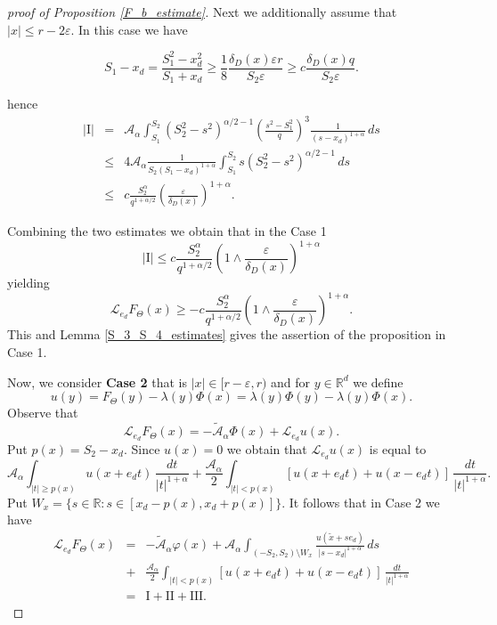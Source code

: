 \documentclass[a4paper,12pt,reqno]{amsart}
\theoremstyle{definition}
\theoremstyle{remark}
\newcommand{\eps}{\varepsilon}
\newcommand{\calA}{\mathcal{A}}
\newcommand{\Aa}{\mathcal{A}_{\alpha}}
\newcommand{\calL}{\mathcal{L}}
\newcommand{\R}{\mathds{R}}
\begin{document}
\begin{proof}[proof of Proposition \ref{F_b_estimate}]
Next we additionally assume that  $|x|\le r-2\eps$. In this case we have

$$S_1-x_d=  \frac {S^2_1-x^2_d}{S_1+x_d}\ge \frac18 \frac{\delta_D(x)\eps r}{S_2\eps}\ge c \frac{\delta_D(x) q}{S_2 \eps}. $$

hence
\begin{eqnarray*}
|\text{I}|
&=& \calA_{\alpha} \int_{S_{1}}^{S_{2}} 
(S_2^2-s^2)^{\alpha/2-1}\left(\frac{s^2-S_1^2}q\right)^3\frac1{(s - x_d)^{1+\alpha} }
 \, ds\\
&\le& 4\calA_{\alpha}\frac1{S_2(S_1-x_d)^{1+\alpha}} \int_{S_{1}}^{S_{2}} 
s(S_2^2-s^2)^{\alpha/2-1}
 \, ds\\  
&\le& c\frac{S_{2}^\alpha}{q^{1+\alpha/2}}\left(\frac \eps{\delta_D(x)}\right)^{1+\alpha}.
\end{eqnarray*}

Combining the two estimates we obtain that in the Case 1
$$|\text{I}|\le  c\frac{S_{2}^\alpha}{q^{1+\alpha/2}}\left(1\wedge\frac \eps{\delta_D(x)}\right)^{1+\alpha}$$
yielding
$$\calL_{e_d} F_{\Theta}(x)\ge -c\frac{S_{2}^\alpha}{q^{1+\alpha/2}}\left(1\wedge\frac \eps{\delta_D(x)}\right)^{1+\alpha}.$$
This and Lemma \ref{S_3_S_4_estimates} gives the assertion of the proposition in Case 1.

Now, we consider {\bf Case 2} that is
 $|x| \in [r -\eps, r)$ and for $y \in \R^d$ we define
$$
u(y) = F_{\Theta}(y) -\lambda(y) \varPhi(x)= \lambda(y) \varPhi(y) -\lambda(y) \varPhi(x).
$$
Observe that 
$$
\calL_{e_d} F_{\Theta}(x) = - \tilde{\calA}_{\alpha}  \varPhi(x) 
+ \calL_{e_d} u(x).
$$
Put $p(x) = S_2 - x_d$. Since $u(x) = 0$ we obtain that $\calL_{e_d} u(x)$ is equal to 
\begin{equation*}
\Aa \int_{|t| \ge p(x)} u(x + e_d t) \, \frac{dt}{|t|^{1 + \alpha}}
+ \frac{\Aa}{2}  \int_{|t| < p(x)} \left[u(x + e_d t) + u(x - e_d t) \right] \, \frac{dt}{|t|^{1 + \alpha}}.
\end{equation*}
Put $W_{x} = \{s \in \R: s \in [x_d - p(x), x_d + p(x)]\}$. 
It follows that in Case 2 we have
\begin{eqnarray*}
\calL_{e_d} F_{\Theta}(x) &=& - \tilde{\calA}_{\alpha}  \varphi(x)
+ \calA_{\alpha} \int_{(-S_2,S_2) \setminus W_{x}} \frac{u(\tilde{x} +s e_d)}{|s - x_d|^{1+\alpha}} \, ds\\ 
&+& \frac{\Aa}{2}  \int_{|t| < p(x)} \left[u(x + e_d t) + u(x - e_d t) \right] \, \frac{dt}{|t|^{1 + \alpha}}\\
&=& \text{I} + \text{II} + \text{III}.
\end{eqnarray*}


\end{proof}
\end{document}
